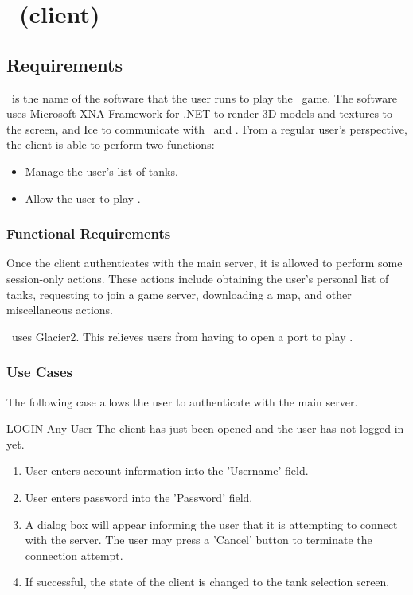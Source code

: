 %

\chapter{\Client\ (client)}
\label{client}

\section{Requirements}

\Client\ is the name of the software that the user runs to play the \VTank\ game. The software uses Microsoft XNA Framework for .NET to render 3D models and textures to the screen, and Ice to communicate with \MainServer\ and \GameServer. From a regular user's perspective, the client is able to perform two functions:
\begin{itemize}
\item Manage the user's list of tanks.
\item Allow the user to play \VTank.
\end{itemize}

\subsection{Functional Requirements}

Once the client authenticates with the main server, it is allowed to perform some session-only actions. These actions include obtaining the user's personal list of tanks, requesting to join a game server, downloading a map, and other miscellaneous actions.

\Client\ uses Glacier2. This relieves users from having to open a port to play \VTank. 

\subsection{Use Cases}

The following case allows the user to authenticate with the main server.

\begin{usecase}
  {LOGIN}
  {Any User}
  {The client has just been opened and the user has not logged in yet.}
\begin{enumerate}
\item User enters account information into the 'Username' field.
\item User enters password into the 'Password' field.
\item A dialog box will appear informing the user that it is attempting to connect with the server. The user may press a 'Cancel' button to terminate the connection attempt.
\item If successful, the state of the client is changed to the tank selection screen.
\end{enumerate}
\end{usecase}


